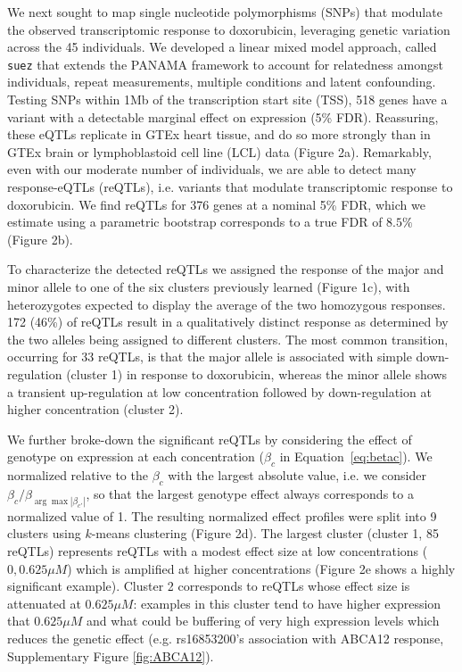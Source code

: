 \documentclass{article}
\begin{document}
{We next sought to map single nucleotide polymorphisms (SNPs) that modulate the observed transcriptomic response to doxorubicin, leveraging genetic variation across the 45 individuals. We developed a linear mixed model approach, called \texttt{suez} that extends the PANAMA framework\citep{Fusi2012} to account for relatedness amongst individuals, repeat measurements, multiple conditions and latent confounding. Testing SNPs within 1Mb of the transcription start site (TSS), 518 genes have a variant with a detectable marginal effect on expression (5\% FDR). Reassuring, these eQTLs replicate in GTEx heart tissue, and do so more strongly than in GTEx brain or lymphoblastoid cell line (LCL) data (Figure 2a). Remarkably, even with our moderate number of individuals, we are able to detect many response-eQTLs (reQTLs), i.e. variants that modulate transcriptomic response to doxorubicin. We find reQTLs for 376 genes at a nominal 5\% FDR, which we estimate using a parametric bootstrap corresponds to a true FDR of $8.5\%$ (Figure 2b). 

To characterize the detected reQTLs we assigned the response of the major and minor allele to one of the six clusters previously learned (Figure 1c), with heterozygotes expected to display the average of the two homozygous responses. 172 (46\%) of reQTLs result in a qualitatively distinct response as determined by the two alleles being assigned to different clusters. The most common transition, occurring for 33 reQTLs, is that the major allele is associated with simple down-regulation (cluster 1) in response to doxorubicin, whereas the minor allele shows a transient up-regulation at low concentration followed by down-regulation at higher concentration (cluster 2). 

We further broke-down the significant reQTLs by considering the effect of genotype on expression at each concentration ($\beta_c$ in Equation~\ref{eq:betac}). We normalized relative to the $\beta_c$ with the largest absolute value, i.e. we consider $\beta_c / \beta_{\arg \max{ |\beta_{c'}| }} $, so that the largest genotype effect always corresponds to a normalized value of 1. The resulting normalized effect profiles were split into 9 clusters using $k$-means clustering (Figure 2d). The largest cluster (cluster 1, 85 reQTLs) represents reQTLs with a modest effect size at low concentrations ($0,0.625\mu M$) which is amplified at higher concentrations (Figure 2e shows a highly significant example). Cluster 2 corresponds to reQTLs whose effect size is attenuated at $0.625\mu M$: examples in this cluster tend to have higher expression that $0.625\mu M$ and what could be buffering of very high expression levels which reduces the genetic effect (e.g. rs16853200's association with ABCA12 response, Supplementary Figure \ref{fig:ABCA12}).

}
\end{document}
